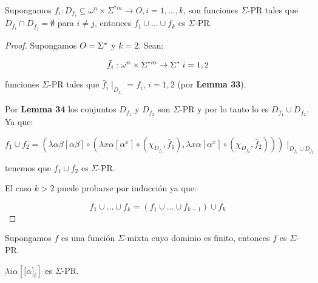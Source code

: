 
  \begin{lemma}
    \par Supongamos $f_{i}: D_{f_{i}} \subseteq \omega^{n} \times \Sigma^{\ast m} \rightarrow O, i = 1, \dotsc, k$, son
    funciones $\Sigma$-PR tales que $D_{f_{i}} \cap D_{f_{j}} = \emptyset$ para $i \neq j$, entonces $f_{1} \cup \dotsc
    \cup f_{k}$ es $\Sigma$-PR.
  \end{lemma}
  \begin{proof}
    \par Supongamos $O = \Sigma^{\ast}$ y $k = 2$. Sean:

    \[
      \bar{f}_{i}: \omega^{n} \times \Sigma^{\ast m} \rightarrow \Sigma^{\ast} \; i = 1, 2
    \]

    \par funciones $\Sigma$-PR tales que $\bar{f}_{i} \mid_{D_{f_{i}}} = f_{i}$, $i = 1, 2$ (por \textbf{Lemma 33}).
    \par Por \textbf{Lemma 34} los conjuntos $D_{f_{1}}$ y $D_{f_{2}}$ son $\Sigma$-PR y por lo tanto lo es $ D_{f_{1}}
    \cup D_{f_{2}}$. Ya que:

    \[
      f_{1} \cup f_{2} = \left(\lambda \alpha \beta \left[\alpha \beta\right] \circ (\lambda x\alpha
      \left[\alpha^{x}\right] \circ (\chi_{D_{f_{1}}}, \bar{f}_{1}), \lambda x\alpha \left[\alpha^{x}\right] \circ
      (\chi_{D_{f_{2}}}, \bar{f}_{2}))\right) \mid_{D_{f_{1}} \cup D_{f_{2}}}
    \]

    \par tenemos que $f_{1} \cup f_{2}$ es $\Sigma$-PR.
    \par El caso $k > 2$ puede probarse por inducción ya que:

    \[
      f_{1} \cup \dotsc \cup f_{k} = (f_{1} \cup \dotsc \cup f_{k-1}) \cup f_{k}
    \]
  \end{proof}

  \begin{corollary}
    \par Supongamos $f$ es una función $\Sigma$-mixta cuyo dominio es finito, entonces $f$ es $\Sigma$-PR.
  \end{corollary}

  \begin{lemma}
    \par $\lambda i\alpha \left[\lbrack \alpha]_{i}\right]$ es $\Sigma$-PR.
  \end{lemma}

